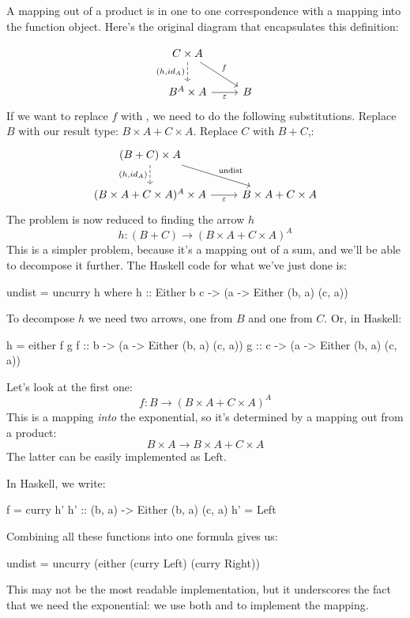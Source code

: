 \documentclass[DaoFP]{subfiles}
\begin{document}
A mapping out of a product is in one to one correspondence with a mapping into the function object. Here's the original diagram that encapsulates this definition:

\[
 \begin{tikzcd}
 C \times A
 \arrow[d, dashed, "{(h, id_A)}"']
 \arrow[rd, "f"]
 \\
 B^A \times A
 \arrow[r, "\varepsilon"']
& B
 \end{tikzcd}
\]
If we want to replace $f$ with , we need to do the following substitutions. Replace $B$ with our result type: $B \times A + C \times A$. Replace $C$ with $B + C$,:
\[
 \begin{tikzcd}
 (B+C) \times A
 \arrow[d, dashed, "{(h, id_A)}"']
 \arrow[rd, "\text{undist}"]
 \\
 (B \times A + C \times A)^A \times A
 \arrow[r, "\varepsilon"']
& B \times A + C \times A
 \end{tikzcd}
\]
The problem is now reduced to finding the arrow $h$
\[ h \colon (B + C) \to  (B \times A + C \times A)^A \]
This is a simpler problem, because it's a mapping out of a sum, and we'll be able to decompose it further. The Haskell code for what we've just done is:
\begin{haskell}
undist = uncurry h
  where
    h :: Either b c -> (a -> Either (b, a) (c, a))
\end{haskell}
To decompose $h$ we need two arrows, one from $B$ and one from $C$. Or, in Haskell:

\begin{haskell}
    h = either f g
    f :: b -> (a -> Either (b, a) (c, a))
    g :: c -> (a -> Either (b, a) (c, a))
\end{haskell}
Let's look at the first one:
\[f \colon B \to (B \times A + C \times A)^A \]
This is a mapping \emph{into} the exponential, so it's determined by a mapping out from a product:
\[ B \times A \to B \times A + C \times A \]
The latter can be easily implemented as $\text{Left}$.

In Haskell, we write:
\begin{haskell}
    f = curry h'
    h' :: (b, a) -> Either (b, a) (c, a)
    h'  = Left
\end{haskell}

Combining all these functions into one formula gives us:
\begin{haskell}
undist = uncurry (either (curry Left) (curry Right))
\end{haskell}
This may not be the most readable implementation, but it underscores the fact that we need the exponential: we use both  and  to implement the mapping.
\end{document}
